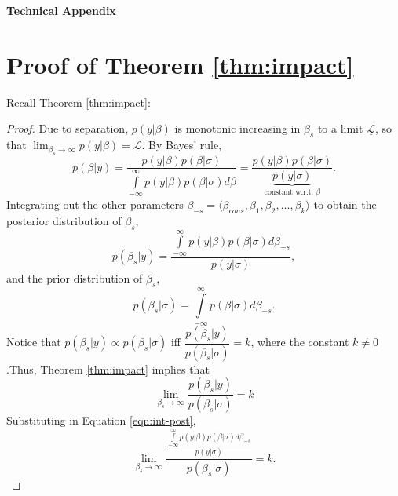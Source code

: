 \documentclass[12pt]{article}
\begin{document}
\clearpage
\begin{appendix}
\begin{center}
\LARGE{\textbf{Technical Appendix}}\vspace{4mm}
\end{center}

\section*{Proof of Theorem \ref{thm:impact}}

Recall Theorem \ref{thm:impact}:

\impact*

\begin{proof}
Due to separation, $p(y|\beta)$ is monotonic increasing in $\beta_s$ to a limit $\underline{\mathscr{L}}$, so that $\displaystyle \lim_{\beta_s \to \infty} p(y | \beta) = \underline{\mathscr{L}}$. By Bayes' rule, 
\begin{equation*}
p(\beta | y) = \dfrac{p(y | \beta)p(\beta | \sigma)}{\int\limits_{-\infty}^{\infty}p(y | \beta)p(\beta | \sigma)d\beta} = \dfrac{p(y | \beta)p(\beta | \sigma)}{\underbrace{p(y | \sigma)}_{\text{constant w.r.t. }\beta}}. 
\end{equation*}
Integrating out the other parameters $\beta_{-s} = \langle \beta_{cons}, \beta_1, \beta_2, ..., \beta_k \rangle$ to obtain the posterior distribution of $\beta_s$, 
\begin{equation}\label{eqn:int-post}
p(\beta_s | y) = \dfrac{\int\limits_{-\infty}^{\infty}p(y | \beta)p(\beta | \sigma)d\beta_{-s}}{p(y | \sigma)}, 
\end{equation}
and the prior distribution of $\beta_s$, 
\begin{equation*}
p(\beta_s | \sigma) = \int\limits_{-\infty}^{\infty}p(\beta | \sigma)d\beta_{-s}.
\end{equation*}
Notice that $p(\beta_s | y) \propto p(\beta_s | \sigma)$ iff $\dfrac{p(\beta_s | y)}{p(\beta_s | \sigma)} = k$, where the constant $k \neq 0$.Thus, Theorem \ref{thm:impact} implies that
\begin{equation*}
\lim _{\beta_s \to \infty} \dfrac{p(\beta_s | y)}{p(\beta_s | \sigma)} = k
\end{equation*}
Substituting in Equation \ref{eqn:int-post},
\begin{equation*}
\lim _{\beta_s \to \infty} \dfrac{\frac{\int\limits_{-\infty}^{\infty}p(y | \beta)p(\beta | \sigma)d\beta_{-s}}{p(y | \sigma)}}{p(\beta_s | \sigma)} = k.
\end{equation*}

\end{proof}
\end{appendix}
\end{document}
